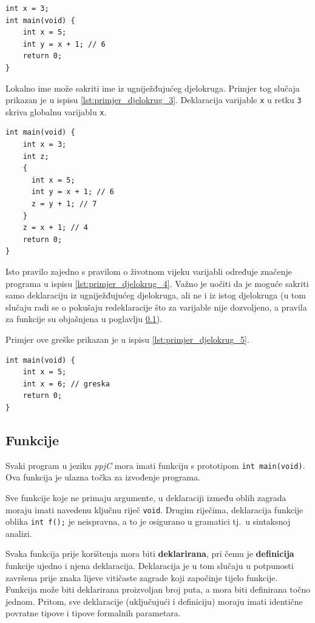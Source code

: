 \documentclass[times, 12pt, utf8]{book}
\begin{document}
\begin{lstlisting}[caption={Sakrivanje globalne deklaracije.},label=lst:primjer_djelokrug_3]
int x = 3;
int main(void) {
    int x = 5;
    int y = x + 1; // 6
    return 0;
}
\end{lstlisting}

Lokalno ime može sakriti ime iz ugniježđujućeg djelokruga.
Primjer tog slučaja prikazan je u ispisu \ref{lst:primjer_djelokrug_3}.
Deklaracija varijable \verb|x| u retku \verb|3| skriva globalnu varijablu \verb|x|.

\begin{lstlisting}[caption={Sakrivanje deklaracije u bloku.},label=lst:primjer_djelokrug_4]
int main(void) {
    int x = 3;
    int z;
    {
      int x = 5;
      int y = x + 1; // 6
      z = y + 1; // 7
    }
    z = x + 1; // 4
    return 0;
}
\end{lstlisting}

Isto pravilo zajedno s pravilom o životnom vijeku varijabli određuje značenje programa u ispisu \ref{lst:primjer_djelokrug_4}.
Važno je uočiti da je moguće sakriti samo deklaraciju iz ugniježđujućeg djelokruga, ali ne i iz istog djelokruga (u tom slučaju radi se o pokušaju redeklaracije što za varijable nije dozvoljeno, a pravila za funkcije su objašnjena u poglavlju \ref{sec:semantika_funkcije}).

Primjer ove greške prikazan je u ispisu \ref{lst:primjer_djelokrug_5}.

\begin{lstlisting}[caption={Nedozvoljena redeklaracija varijable.},label=lst:primjer_djelokrug_5]
int main(void) {
    int x = 5;
    int x = 6; // greska
    return 0;
}
\end{lstlisting}

\subsection{Funkcije}\label{sec:semantika_funkcije}
Svaki program u jeziku \emph{ppjC} mora imati funkciju s prototipom \verb|int main(void)|.
Ova funkcija je ulazna točka za izvođenje programa.

Sve funkcije koje ne primaju argumente, u deklaraciji između oblih zagrada moraju imati navedenu ključnu riječ \verb|void|.
Drugim riječima, deklaracija funkcije oblika \verb|int f();| je neispravna, a to je osigurano u gramatici tj.~u sintaksnoj analizi.

Svaka funkcija prije korištenja mora biti \textbf{deklarirana}, pri čemu je \textbf{definicija} funkcije ujedno i njena deklaracija.
Deklaracija je u tom slučaju u potpunosti završena prije znaka lijeve vitičaste zagrade koji započinje tijelo funkcije.
Funkcija može biti deklarirana proizvoljan broj puta, a mora biti definirana točno jednom.
Pritom, sve deklaracije (uključujući i definiciju) moraju imati identične povratne tipove i tipove formalnih parametara.
\end{document}

